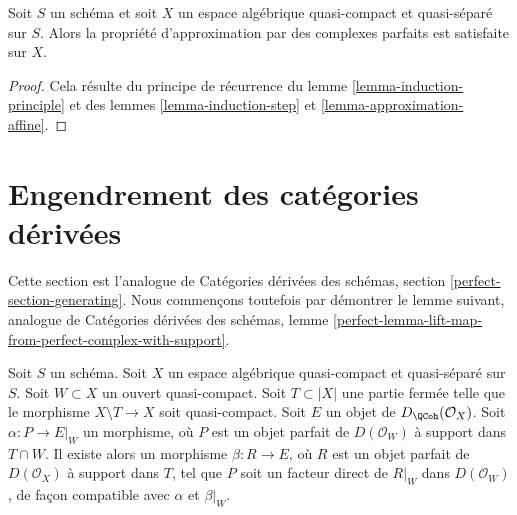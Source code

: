 \begin{theorem}
\label{theorem-approximation}
Soit $S$ un sch\'ema et soit $X$ un espace alg\'ebrique quasi-compact et
quasi-s\'epar\'e sur $S$. Alors la propri\'et\'e d'approximation par des
complexes parfaits est satisfaite sur $X$.
\end{theorem}

\begin{proof}
Cela r\'esulte du principe de r\'ecurrence du lemme
\ref{lemma-induction-principle} et des lemmes \ref{lemma-induction-step} et
\ref{lemma-approximation-affine}.
\end{proof}






\section{Engendrement des cat\'egories d\'eriv\'ees}
\label{section-generating}

\noindent
Cette section est l'analogue de Cat\'egories d\'eriv\'ees des sch\'emas,
section \ref{perfect-section-generating}. Nous commen\c{c}ons toutefois par
d\'emontrer le lemme suivant, analogue de Cat\'egories d\'eriv\'ees des
sch\'emas, lemme
\ref{perfect-lemma-lift-map-from-perfect-complex-with-support}.

\begin{lemma}
\label{lemma-lift-map-from-perfect-complex-with-support}
Soit $S$ un sch\'ema. Soit $X$ un espace alg\'ebrique quasi-compact et
quasi-s\'epar\'e sur $S$. Soit $W\subset X$ un ouvert quasi-compact. Soit
$T\subset|X|$ une partie ferm\'ee telle que le morphisme
$X\setminus T\to X$ soit quasi-compact. Soit $E$ un objet de
$D_\QCoh(\mathcal{O}_X)$. Soit $\alpha:P\to E|_W$ un morphisme, o\`u $P$ est
un objet parfait de $D(\mathcal{O}_W)$ \`a support dans $T\cap W$. Il existe
alors un morphisme $\beta:R\to E$, o\`u $R$ est un objet parfait de
$D(\mathcal{O}_X)$ \`a support dans $T$, tel que $P$ soit un facteur direct
de $R|_W$ dans $D(\mathcal{O}_W)$, de fa\c{c}on compatible avec $\alpha$ et
$\beta|_W$.
\end{lemma}

